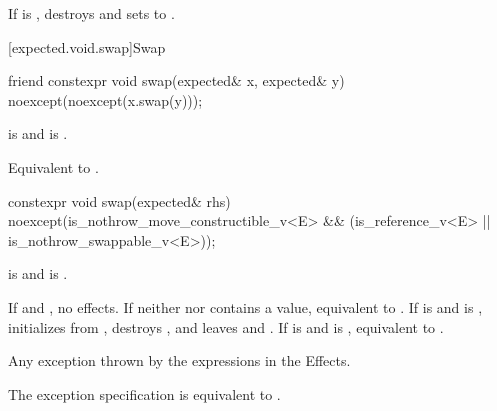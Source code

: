 \begin{itemdescr}
\pnum
\effects
If  is , destroys  and sets  to .
\end{itemdescr}

[expected.void.swap]{Swap}

%
\begin{itemdecl}
friend constexpr void swap(expected& x, expected& y) noexcept(noexcept(x.swap(y)));
\end{itemdecl}

\begin{itemdescr}
\pnum
\constraints
{} is  and  is .

\pnum
\effects
Equivalent to .
\end{itemdescr}

%
\begin{itemdecl}
constexpr void swap(expected& rhs) noexcept(is_nothrow_move_constructible_v<E> &&
                                            (is_reference_v<E> ||
                                             is_nothrow_swappable_v<E>));
\end{itemdecl}

\begin{itemdescr}
\pnum
\constraints
{} is  and  is .

\pnum
\effects
If  and , no effects. If neither  nor  contains a value, equivalent to . If  is  and  is , initializes  from , destroys , and leaves   and  . If  is  and  is , equivalent to .

\pnum
\throws
Any exception thrown by the expressions in the Effects.

\pnum
\remarks
The exception specification is equivalent to .
\end{itemdescr}

